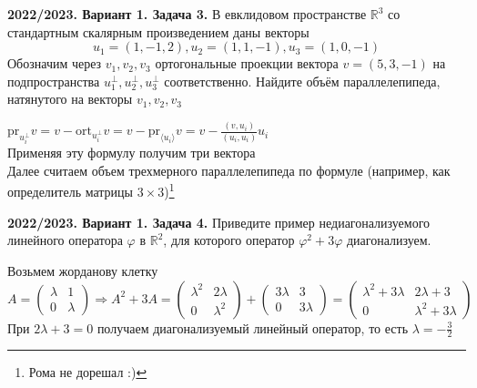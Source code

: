 \documentclass[a4paper]{article}
\newcommand{\pr}{\text{pr}}
\newcommand{\ort}{\text{ort}}
\begin{document}
\begin{tcolorbox}[colback=blue!20!white, colframe=black!100!black]
    \textbf{2022/2023. Вариант 1. Задача 3.} В евклидовом пространстве $\mathbb{R}^{3}$ со стандартным скалярным произведением даны векторы
$$u_{1}=(1,-1,2), u_{2}=(1,1,-1), u_{3}=(1,0,-1)$$
Обозначим через $v_{1}, v_{2}, v_{3}$ ортогональные проекции вектора $v=(5,3,-1)$ на подпространства $u_{1}^{\perp}, u_{2}^{\perp}, u_{3}^{\perp}$ соответственно. Найдите объём параллелепипеда, натянутого на векторы $v_{1}, v_{2}, v_{3}$
\end{tcolorbox}
$\pr_{u_i^{\perp}} v=v-\ort_{u_i^{\perp}} v=v-\pr_{\langle u_i\rangle} v=v-\displaystyle\frac{(v, u_i)}{(u_i,u_i)}u_i$\\[2mm]
\indent Применяя эту формулу получим три вектора\\[2mm]
\indent Далее считаем объем трехмерного параллелепипеда по формуле (например, как определитель матрицы $3\times3$)\footnote{Рома не дорешал :)}\\[2mm]

 
\newpage

\begin{tcolorbox}[colback=blue!20!white, colframe=black!100!black]
     \textbf{2022/2023. Вариант 1. Задача 4.} Приведите пример недиагонализуемого линейного оператора $\varphi$ в $\mathbb{R}^{2}$, для которого оператор $\varphi^{2}+3 \varphi$ диагонализуем.
\end{tcolorbox}
Возьмем жорданову клетку
$$A=\begin{pmatrix}
    \lambda&1\\
    0&\lambda
\end{pmatrix}\Rightarrow A^2+3A=\begin{pmatrix}
    \lambda^2&2\lambda\\
    0&\lambda^2
\end{pmatrix}+\begin{pmatrix}
    3\lambda&3\\
    0&3\lambda
\end{pmatrix}=\begin{pmatrix}
    \lambda^2+3\lambda&2\lambda+3\\
    0&\lambda^2+3\lambda
\end{pmatrix}$$
\indent При $2\lambda+3=0$ получаем диагонализуемый линейный оператор, то есть $\lambda=-\displaystyle\frac{3}{2}$

\newpage
\end{document}

